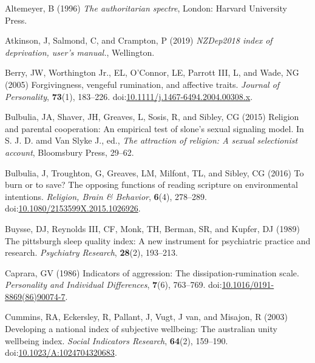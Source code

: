 \documentclass[
  single column]{article}
\newlength{\cslhangindent}
\newenvironment{CSLReferences}[2] %
 {\begin{list}{}{%
  \setlength{\itemindent}{0pt}
  \setlength{\leftmargin}{0pt}
  \setlength{\parsep}{0pt}
  \ifodd #1
   \setlength{\leftmargin}{\cslhangindent}
   \setlength{\itemindent}{-1\cslhangindent}
  \fi
  \setlength{\itemsep}{#2\baselineskip}}}
 {\end{list}}
\begin{document}
\label{refs}
\begin{CSLReferences}{1}{0}
Altemeyer, B (1996) \emph{The authoritarian spectre}, London: Harvard
University Press.

Atkinson, J, Salmond, C, and Crampton, P (2019) \emph{NZDep2018 index of
deprivation, user{'}s manual.}, Wellington.

Berry, JW, Worthington Jr., EL, O'Connor, LE, Parrott III, L, and Wade,
NG (2005) Forgivingness, vengeful rumination, and affective traits.
\emph{Journal of Personality}, \textbf{73}(1), 183--226.
doi:\href{https://doi.org/10.1111/j.1467-6494.2004.00308.x}{10.1111/j.1467-6494.2004.00308.x}.

Bulbulia, JA, Shaver, JH, Greaves, L, Sosis, R, and Sibley, CG (2015)
Religion and parental cooperation: An empirical test of slone's sexual
signaling model. In S. J. D. amd Van Slyke J., ed., \emph{The attraction
of religion: A sexual selectionist account}, Bloomsbury Press, 29--62.

Bulbulia, J, Troughton, G, Greaves, LM, Milfont, TL, and Sibley, CG
(2016) To burn or to save? The opposing functions of reading scripture
on environmental intentions. \emph{Religion, Brain \& Behavior},
\textbf{6}(4), 278--289.
doi:\href{https://doi.org/10.1080/2153599X.2015.1026926}{10.1080/2153599X.2015.1026926}.

Buysse, DJ, Reynolds III, CF, Monk, TH, Berman, SR, and Kupfer, DJ
(1989) The pittsburgh sleep quality index: A new instrument for
psychiatric practice and research. \emph{Psychiatry Research},
\textbf{28}(2), 193--213.

Caprara, GV (1986) Indicators of aggression: The dissipation-rumination
scale. \emph{Personality and Individual Differences}, \textbf{7}(6),
763--769.
doi:\href{https://doi.org/10.1016/0191-8869(86)90074-7}{10.1016/0191-8869(86)90074-7}.

Cummins, RA, Eckersley, R, Pallant, J, Vugt, J van, and Misajon, R
(2003) Developing a national index of subjective wellbeing: The
australian unity wellbeing index. \emph{Social Indicators Research},
\textbf{64}(2), 159--190.
doi:\href{https://doi.org/10.1023/A:1024704320683}{10.1023/A:1024704320683}.


\end{CSLReferences}
\end{document}
